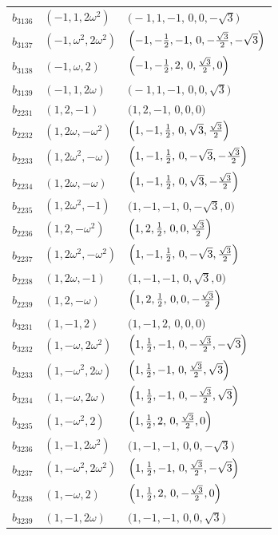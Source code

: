 \documentclass[%
  reprint,
  superscriptaddress,
  amsmath,amssymb,
  pra,
  floatfix,
  longbibliography
]{revtex4-2}
\begin{document}
\begin{longtable}{lll}
$b_{3136}$ & $(-1,1,2\omega^2)$ &
$\bigl(-1,1,-1,\,0,0,-\sqrt{3}\bigr)$ \\
$b_{3137}$ & $(-1,\omega^2,2\omega^2)$ &
$\Bigl(-1,-\tfrac12,-1,\,0,-\tfrac{\sqrt{3}}{2},-\sqrt{3}\Bigr)$ \\
$b_{3138}$ & $(-1,\omega,2)$ &
$\Bigl(-1,-\tfrac12,2,\,0,\tfrac{\sqrt{3}}{2},0\Bigr)$ \\
$b_{3139}$ & $(-1,1,2\omega)$ &
$\bigl(-1,1,-1,\,0,0,\sqrt{3}\bigr)$ \\
$b_{2231}$ & $(1,2,-1)$ &
$\bigl(1,2,-1,\,0,0,0\bigr)$ \\
$b_{2232}$ & $(1,2\omega,-\omega^2)$ &
$\Bigl(1,-1,\tfrac12,\,0,\sqrt{3},\tfrac{\sqrt{3}}{2}\Bigr)$ \\
$b_{2233}$ & $(1,2\omega^2,-\omega)$ &
$\Bigl(1,-1,\tfrac12,\,0,-\sqrt{3},-\tfrac{\sqrt{3}}{2}\Bigr)$ \\
$b_{2234}$ & $(1,2\omega,-\omega)$ &
$\Bigl(1,-1,\tfrac12,\,0,\sqrt{3},-\tfrac{\sqrt{3}}{2}\Bigr)$ \\
$b_{2235}$ & $(1,2\omega^2,-1)$ &
$\bigl(1,-1,-1,\,0,-\sqrt{3},0\bigr)$ \\
$b_{2236}$ & $(1,2,-\omega^2)$ &
$\Bigl(1,2,\tfrac12,\,0,0,\tfrac{\sqrt{3}}{2}\Bigr)$ \\
$b_{2237}$ & $(1,2\omega^2,-\omega^2)$ &
$\Bigl(1,-1,\tfrac12,\,0,-\sqrt{3},\tfrac{\sqrt{3}}{2}\Bigr)$ \\
$b_{2238}$ & $(1,2\omega,-1)$ &
$\bigl(1,-1,-1,\,0,\sqrt{3},0\bigr)$ \\
$b_{2239}$ & $(1,2,-\omega)$ &
$\Bigl(1,2,\tfrac12,\,0,0,-\tfrac{\sqrt{3}}{2}\Bigr)$ \\
$b_{3231}$ & $(1,-1,2)$ &
$\bigl(1,-1,2,\,0,0,0\bigr)$ \\
$b_{3232}$ & $(1,-\omega,2\omega^2)$ &
$\Bigl(1,\tfrac12,-1,\,0,-\tfrac{\sqrt{3}}{2},-\sqrt{3}\Bigr)$ \\
$b_{3233}$ & $(1,-\omega^2,2\omega)$ &
$\Bigl(1,\tfrac12,-1,\,0,\tfrac{\sqrt{3}}{2},\sqrt{3}\Bigr)$ \\
$b_{3234}$ & $(1,-\omega,2\omega)$ &
$\Bigl(1,\tfrac12,-1,\,0,-\tfrac{\sqrt{3}}{2},\sqrt{3}\Bigr)$ \\
$b_{3235}$ & $(1,-\omega^2,2)$ &
$\Bigl(1,\tfrac12,2,\,0,\tfrac{\sqrt{3}}{2},0\Bigr)$ \\
$b_{3236}$ & $(1,-1,2\omega^2)$ &
$\bigl(1,-1,-1,\,0,0,-\sqrt{3}\bigr)$ \\
$b_{3237}$ & $(1,-\omega^2,2\omega^2)$ &
$\Bigl(1,\tfrac12,-1,\,0,\tfrac{\sqrt{3}}{2},-\sqrt{3}\Bigr)$ \\
$b_{3238}$ & $(1,-\omega,2)$ &
$\Bigl(1,\tfrac12,2,\,0,-\tfrac{\sqrt{3}}{2},0\Bigr)$ \\
$b_{3239}$ & $(1,-1,2\omega)$ &
$\bigl(1,-1,-1,\,0,0,\sqrt{3}\bigr)$ \\
\end{longtable}
\endgroup
\end{document}
